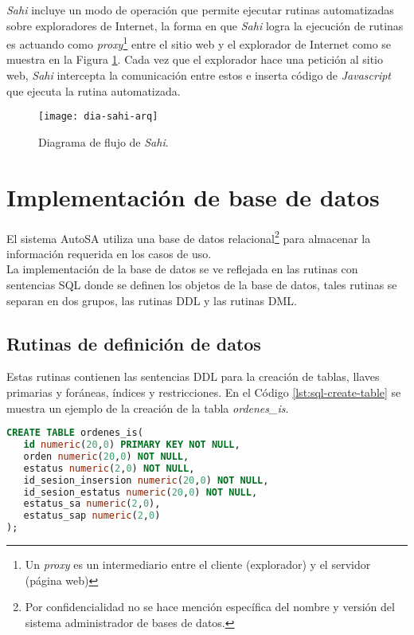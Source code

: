 \textit{Sahi} incluye un modo de operación que permite ejecutar rutinas automatizadas sobre exploradores de Internet, la forma en que \textit{Sahi} logra la ejecución de rutinas es actuando como \textit{proxy}\footnote{Un \textit{proxy} es un intermediario entre el cliente (explorador) y el servidor (página web)\cite{BeginningUbuntuLinux}} entre el sitio web y el explorador de Internet como se muestra en la Figura \ref{fig:dia-sahi-arq}. Cada vez que el explorador hace una petición al sitio web, \textit{Sahi} intercepta la comunicación entre estos e inserta código de \textit{Javascript} que ejecuta la rutina automatizada\cite{WebEng9IntConf, SahiPro}.

\begin{figure}[h]
\centering
\texttt{[image: dia-sahi-arq]}
\caption{Diagrama de flujo de \textit{Sahi}\cite{SahiPro}.}
\label{fig:dia-sahi-arq}
\end{figure}

%

\section{Implementación de base de datos}\label{sec:impl-db}
El sistema AutoSA utiliza una base de datos relacional\footnote{Por confidencialidad no se hace mención específica del nombre y versión del sistema administrador de bases de datos.} para almacenar la información requerida en los casos de uso.\\
La implementación de la base de datos se ve reflejada en las rutinas con sentencias SQL donde se definen los objetos de la base de datos, tales rutinas se separan en dos grupos, las rutinas DDL y las rutinas DML.

\subsection{Rutinas de definición de datos}
Estas rutinas contienen las sentencias DDL para la creación de tablas, llaves primarias y foráneas, índices y restricciones. En el Código \ref{lst:sql-create-table} se muestra un ejemplo de la creación de la tabla \textit{ordenes\_is}.
\begin{lstlisting}[language=SQL, caption={Sentencia para crear una tabla.}, captionpos=b, label={lst:sql-create-table}]
CREATE TABLE ordenes_is(
   id numeric(20,0) PRIMARY KEY NOT NULL,
   orden numeric(20,0) NOT NULL,
   estatus numeric(2,0) NOT NULL,
   id_sesion_insersion numeric(20,0) NOT NULL,
   id_sesion_estatus numeric(20,0) NOT NULL,
   estatus_sa numeric(2,0),
   estatus_sap numeric(2,0)
);
\end{lstlisting}

